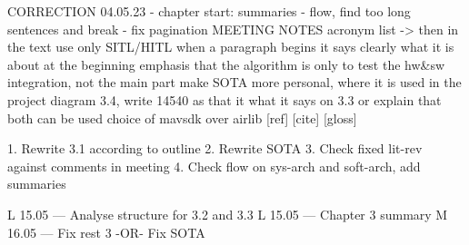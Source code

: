 CORRECTION 04.05.23
 - chapter start: summaries
 - flow, find too long sentences and break
 - fix pagination
 MEETING NOTES
 acronym list -> then in the text use only SITL/HITL
when a paragraph begins it says clearly what it is about at the beginning
emphasis that the algorithm is only to test the hw&sw integration, not the main part
make SOTA more personal, where it is used in the project
diagram 3.4, write 14540 as that it what it says on 3.3 or explain that both can be used
choice of mavsdk over airlib
[ref] [cite] [gloss]



1. Rewrite 3.1 according to outline
2. Rewrite SOTA
3. Check fixed lit-rev against comments in meeting
4. Check flow on sys-arch and soft-arch, add summaries


L 15.05 --- Analyse structure for 3.2 and 3.3
L 15.05 --- Chapter 3 summary
M 16.05 --- Fix rest 3 -OR- Fix SOTA